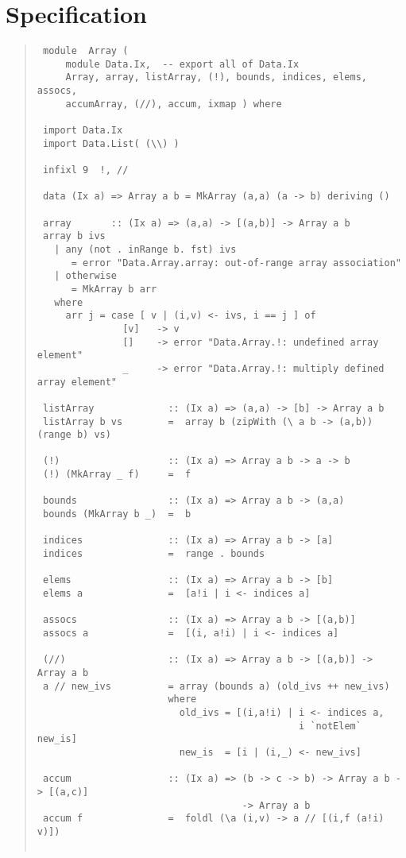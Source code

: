 \section{Specification
}
\begin{quote}
{\haddockverb\begin{verbatim}
 module  Array ( 
     module Data.Ix,  -- export all of Data.Ix
     Array, array, listArray, (!), bounds, indices, elems, assocs, 
     accumArray, (//), accum, ixmap ) where
 
 import Data.Ix
 import Data.List( (\\) )
 
 infixl 9  !, //
 
 data (Ix a) => Array a b = MkArray (a,a) (a -> b) deriving ()
 
 array       :: (Ix a) => (a,a) -> [(a,b)] -> Array a b
 array b ivs
   | any (not . inRange b. fst) ivs
      = error "Data.Array.array: out-of-range array association"
   | otherwise
      = MkArray b arr
   where
     arr j = case [ v | (i,v) <- ivs, i == j ] of
               [v]   -> v
               []    -> error "Data.Array.!: undefined array element"
               _     -> error "Data.Array.!: multiply defined array element"
 
 listArray             :: (Ix a) => (a,a) -> [b] -> Array a b
 listArray b vs        =  array b (zipWith (\ a b -> (a,b)) (range b) vs)
 
 (!)                   :: (Ix a) => Array a b -> a -> b
 (!) (MkArray _ f)     =  f
 
 bounds                :: (Ix a) => Array a b -> (a,a)
 bounds (MkArray b _)  =  b
 
 indices               :: (Ix a) => Array a b -> [a]
 indices               =  range . bounds
 
 elems                 :: (Ix a) => Array a b -> [b]
 elems a               =  [a!i | i <- indices a]
 
 assocs                :: (Ix a) => Array a b -> [(a,b)]
 assocs a              =  [(i, a!i) | i <- indices a]
 
 (//)                  :: (Ix a) => Array a b -> [(a,b)] -> Array a b
 a // new_ivs          = array (bounds a) (old_ivs ++ new_ivs)
                       where
                         old_ivs = [(i,a!i) | i <- indices a,
                                              i `notElem` new_is]
                         new_is  = [i | (i,_) <- new_ivs]
 
 accum                 :: (Ix a) => (b -> c -> b) -> Array a b -> [(a,c)]
                                    -> Array a b
 accum f               =  foldl (\a (i,v) -> a // [(i,f (a!i) v)])
 

\end{verbatim}}
\end{quote}
